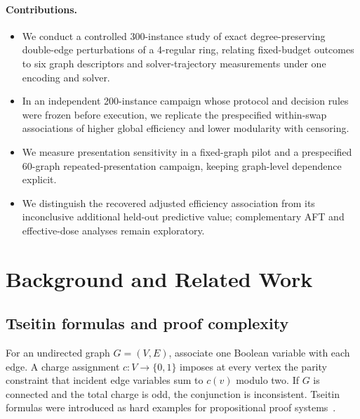 \documentclass[11pt]{article}
\begin{document}
\paragraph{Contributions.}
\begin{itemize}[leftmargin=1.5em]
    \item We conduct a controlled 300-instance study of exact degree-preserving double-edge perturbations of a 4-regular ring, relating fixed-budget outcomes to six graph descriptors and solver-trajectory measurements under one encoding and solver.
    \item In an independent 200-instance campaign whose protocol and decision rules were frozen before execution, we replicate the prespecified within-swap associations of higher global efficiency and lower modularity with censoring.
    \item We measure presentation sensitivity in a fixed-graph pilot and a prespecified 60-graph repeated-presentation campaign, keeping graph-level dependence explicit.
    \item We distinguish the recovered adjusted efficiency association from its inconclusive additional held-out predictive value; complementary AFT and effective-dose analyses remain exploratory.
\end{itemize}

\section{Background and Related Work}

\subsection{Tseitin formulas and proof complexity}

For an undirected graph $G=(V,E)$, associate one Boolean variable with each edge. A charge assignment $c:V\to\{0,1\}$ imposes at every vertex the parity constraint that incident edge variables sum to $c(v)$ modulo two. If $G$ is connected and the total charge is odd, the conjunction is inconsistent. Tseitin formulas were introduced as hard examples for propositional proof systems~\cite{Tseitin1970}.
\end{document}

